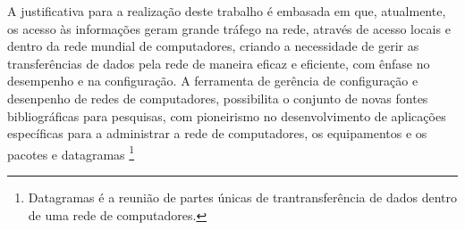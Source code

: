 
\par A justificativa para a realização deste trabalho é embasada em que,
atualmente, os acesso às informações geram grande tráfego na rede, 
através de acesso locais e dentro da rede mundial de computadores, criando a necessidade de gerir as transferências
de dados pela rede de maneira eficaz e eficiente, com ênfase no desempenho e na
configuração. A ferramenta de gerência de configuração e desenpenho de redes de
computadores, possibilita o conjunto de novas fontes bibliográficas para
pesquisas, com pioneirismo no desenvolvimento de aplicações específicas para a administrar a 
rede de computadores, os equipamentos e os pacotes e datagramas
\footnote{Datagramas é a reunião de partes únicas de 
trantransferência de dados dentro de uma rede de computadores.}



 
